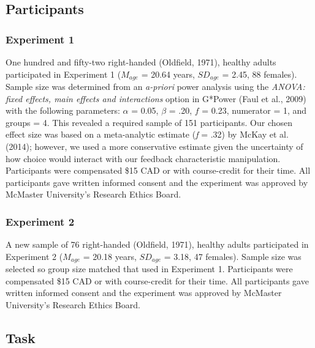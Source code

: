 \documentclass[
  man, donotrepeattitle,floatsintext]{apa7}
\begin{document}
\hypertarget{participants}{%
\subsection{Participants}\label{participants}}

\hypertarget{experiment-1}{%
\subsubsection{Experiment 1}\label{experiment-1}}

One hundred and fifty-two right-handed (Oldfield, 1971), healthy adults participated in Experiment 1 (\(M_{age}\) = 20.64 years, \(SD_{age}\) = 2.45, 88 females). Sample size was determined from an \emph{a-priori} power analysis using the \emph{ANOVA: fixed effects, main effects and interactions} option in G*Power (Faul et al., 2009) with the following parameters: \(\alpha\) = 0.05, \(\beta\) = .20, \(f\) = 0.23, numerator = 1, and groups = 4. This revealed a required sample of 151 participants. Our chosen effect size was based on a meta-analytic estimate (\emph{f} = .32) by McKay et al. (2014); however, we used a more conservative estimate given the uncertainty of how choice would interact with our feedback characteristic manipulation. Participants were compensated \$15 CAD or with course-credit for their time. All participants gave written informed consent and the experiment was approved by McMaster University's Research Ethics Board.

\hypertarget{experiment-2}{%
\subsubsection{Experiment 2}\label{experiment-2}}

A new sample of 76 right-handed (Oldfield, 1971), healthy adults participated in Experiment 2 (\(M_{age}\) = 20.18 years, \(SD_{age}\) = 3.18, 47 females). Sample size was selected so group size matched that used in Experiment 1. Participants were compensated \$15 CAD or with course-credit for their time. All participants gave written informed consent and the experiment was approved by McMaster University's Research Ethics Board.

\hypertarget{task}{%
\subsection{Task}\label{task}}
\end{document}
